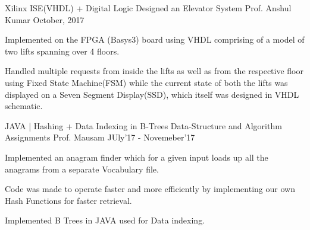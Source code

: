 \begin{cventries}
  \cventry
    {Xilinx ISE(VHDL) + Digital Logic} %
    {Designed an Elevator System} %
    {Prof. Anshul Kumar} %
    {October, 2017} %
    {
      \begin{cvitems} %
        \item {Implemented on the FPGA (Basys3) board using VHDL comprising of a model of two lifts
spanning over 4 floors.}
        \item {Handled multiple requests from inside the lifts as well as from the respective floor using Fixed State Machine(FSM) while the current state of both the lifts
was displayed on a Seven Segment Display(SSD), which itself was designed in VHDL schematic.
}
      \end{cvitems}
    }

  \cventry
    {JAVA | Hashing + Data Indexing in B‑Trees } %
    {Data-Structure and Algorithm Assignments} %
    {Prof. Mausam} %
    {JUly'17 - Novemeber'17} %
    {
      \begin{cvitems} %
        \item {Implemented an anagram finder which for a given input loads up all the anagrams from a separate Vocabulary file.
}
        \item {Code was made to operate faster and more efficiently by implementing
our own Hash Functions
for faster retrieval.}
	\item {
     Implemented B Trees in JAVA used for Data indexing.
    }
      \end{cvitems}
    }

\end{cventries}
